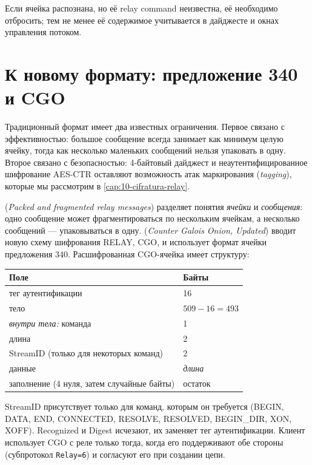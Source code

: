Если ячейка распознана, но её relay command неизвестна, её необходимо отбросить; тем не менее её содержимое учитывается в дайджесте и окнах управления потоком.

\section{К новому формату: предложение 340 и CGO}\label{sec:nuovo-formato}

Традиционный формат имеет два известных ограничения. Первое связано с эффективностью: большое сообщение всегда занимает как минимум целую ячейку, тогда как несколько маленьких сообщений нельзя упаковать в одну. Второе связано с безопасностью: 4-байтовый дайджест и неаутентифицированное шифрование AES-CTR оставляют возможность атак маркирования (\emph{tagging}), которые мы рассмотрим в \cref{cap:10-cifratura-relay}.

 (\emph{Packed and fragmented relay messages}) разделяет понятия \emph{ячейки} и \emph{сообщения}: одно сообщение может фрагментироваться по нескольким ячейкам, а несколько сообщений --- упаковываться в одну.  (\emph{Counter Galois Onion, Updated}) вводит новую схему шифрования RELAY, CGO, и использует формат ячейки предложения 340. Расшифрованная CGO-ячейка имеет структуру:

\begin{center}
\begin{tabular}{ll}
\toprule
Поле & Байты \\
\midrule
тег аутентификации & 16 \\
тело & $509 - 16 = 493$ \\
\midrule
\quad \emph{внутри тела:} команда & 1 \\
\quad длина & 2 \\
\quad StreamID (только для некоторых команд) & 2 \\
\quad данные & \emph{длина} \\
\quad заполнение (4 нуля, затем случайные байты) & остаток \\
\bottomrule
\end{tabular}
\end{center}

StreamID присутствует только для команд, которым он требуется (BEGIN, DATA, END, CONNECTED, RESOLVE, RESOLVED, BEGIN\_DIR, XON, XOFF). Recognized и Digest исчезают, их заменяет тег аутентификации. Клиент использует CGO с реле только тогда, когда его поддерживают обе стороны (субпротокол \texttt{Relay=6}) и согласуют его при создании цепи.

